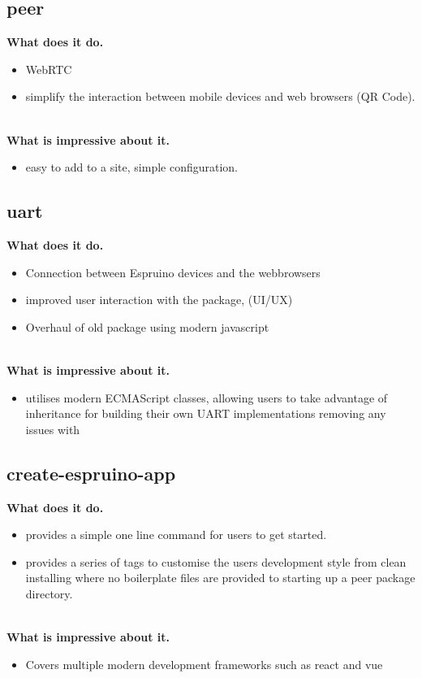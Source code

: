 \documentclass{l4proj}
\begin{document}
\subsection{peer}

\textbf{What does it do.}
\begin{itemize}
    \item WebRTC
    \item simplify the interaction between mobile devices and web browsers (QR Code).
\end{itemize}
\\
\textbf{What is impressive about it.}
\begin{itemize}
    \item easy to add to a site, simple configuration.
\end{itemize}
\subsection{uart}

\textbf{What does it do.}
\begin{itemize}
    \item Connection between Espruino devices and the webbrowsers
    \item improved user interaction with the package, (UI/UX)
    \item Overhaul of old package using modern javascript
\end{itemize}
\\
\textbf{What is impressive about it.}
\begin{itemize}
    \item utilises modern ECMAScript classes, allowing users to take advantage of inheritance for building their own UART implementations removing any issues with 
\end{itemize}

\subsection{create-espruino-app}

\textbf{What does it do.}
\begin{itemize}
    \item provides a simple one line command for users to get started. 
    \item provides a series of tags to customise the users development style from clean installing where no boilerplate files are provided to starting up a peer package directory.
\end{itemize}
\\
\textbf{What is impressive about it.}
\begin{itemize}
    \item Covers multiple modern development frameworks such as react and vue
\end{itemize}
\end{document}
